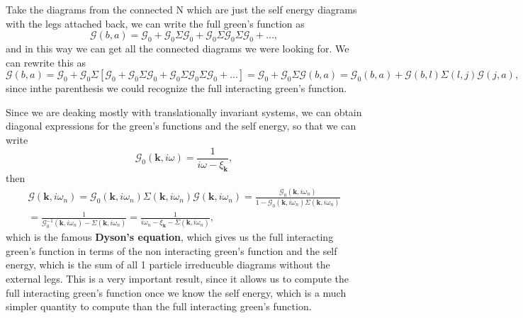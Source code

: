 Take the diagrams from the connected N which are just the self energy diagrams with the legs attached back, we can write the full green's function as 
\[
    \mathcal{G}(b,a) = \mathcal{G}_0 + \mathcal{G}_0 \Sigma \mathcal{G}_0 + \mathcal{G}_0 \Sigma \mathcal{G}_0 \Sigma \mathcal{G}_0 + \dots,
\]
and in this way we can get all the connected diagrams we were looking for. We can rewrite this as
\[
    \mathcal{G}(b,a) = \mathcal{G}_0 + \mathcal{G}_0 \Sigma \left[ \mathcal{G}_0 + \mathcal{G}_0 \Sigma \mathcal{G}_0 + \mathcal{G}_0 \Sigma \mathcal{G}_0 \Sigma \mathcal{G}_0 + \dots \right] = \mathcal{G}_0 + \mathcal{G}_0 \Sigma \mathcal{G}(b,a) = \mathcal{G}_0(b,a) + \mathcal{G}(b,l)\Sigma(l,j)\mathcal{G} (j,a),
\]
since inthe parenthesis we could recognize the full interacting green's function.

Since we are deaking mostly with translationally invariant systems, we can obtain diagonal expressions for the green's functions and the self energy, so that we can write
\[
    \mathcal{G}_0(\mathbf{k}, i\omega) = \frac{1}{i \omega - \xi_{\mathbf{k}}},
\]
then
\[
    \begin{aligned}
        \mathcal{G}(\mathbf{k}, i\omega_n) = \mathcal{G}_0(\mathbf{k}, i \omega_n) \Sigma (\mathbf{k}, i \omega_n) \mathcal{G}(\mathbf{k}, i \omega_n) = \frac{\mathcal{G}_0(\mathbf{k},i \omega_n)}{1 - \mathcal{G}_0(\mathbf{k}, i \omega_n) \Sigma(\mathbf{k}, i \omega_n)} \\
        = \frac{1}{\mathcal{G}_0^{-1}(\mathbf{k}, i \omega_n) - \Sigma(\mathbf{k}, i \omega_n)} = \frac{1}{i \omega_n - \xi_{\mathbf{k}} - \Sigma(\mathbf{k}, i \omega_n)},
    \end{aligned}
\]
which is the famous \textbf{Dyson's equation}, which gives us the full interacting green's function in terms of the non interacting green's function and the self energy, which is the sum of all 1 particle irreducuble diagrams without the external legs. This is a very important result, since it allows us to compute the full interacting green's function once we know the self energy, which is a much simpler quantity to compute than the full interacting green's function.

